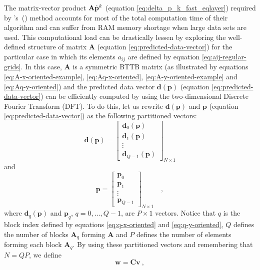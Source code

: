 \documentclass[manuscript,revised]{geophysics}
\begin{document}
The matrix-vector product $\tensor{A} \hat{\mathbf{p}}^{k}$ (equation \ref{eq:delta_p_k_fast_eqlayer}) 
required by \citeauthor{siqueira-etal2017}'s~(\citeyear{siqueira-etal2017}) method
accounts for most of the total computation time of their algorithm and can suffer
from RAM memory shortage when large data sets are used.
This computational load can be drastically lessen by exploring the well-defined structure of 
matrix $\mathbf{A}$ (equation \ref{eq:predicted-data-vector}) for the particular case in which 
its elements $a_{ij}$ are defined by equation \ref{eq:aij-regular-grids}. 
In this case, $\mathbf{A}$ is a symmetric BTTB matrix (as illustrated by equations
\ref{eq:A-x-oriented-example}, \ref{eq:Aq-x-oriented}, \ref{eq:A-y-oriented-example} and
\ref{eq:Aq-y-oriented}) and the predicted data vector 
$\mathbf{d}(\mathbf{p})$ (equation \ref{eq:predicted-data-vector}) can be efficiently
computed by using the two-dimensional Discrete Fourier Transform (DFT).
To do this, let us rewrite $\mathbf{d}(\mathbf{p})$ and
$\mathbf{p}$ (equation \ref{eq:predicted-data-vector}) as the following partitioned vectors:
\begin{equation}
\mathbf{d}(\mathbf{p}) = \begin{bmatrix}
\mathbf{d}_{0}(\mathbf{p}) \\
\mathbf{d}_{1}(\mathbf{p}) \\
\vdots \\
\mathbf{d}_{Q - 1}(\mathbf{p})
\end{bmatrix}_{N \times 1}
\label{eq:predicted-data-vector-partitioned}
\end{equation}
and
\begin{equation}
\mathbf{p} = \begin{bmatrix}
\mathbf{p}_{0} \\
\mathbf{p}_{1} \\
\vdots \\
\mathbf{p}_{Q - 1}
\end{bmatrix}_{N \times 1} \quad ,
\label{eq:parameter-vector-partitioned}
\end{equation}
where $\mathbf{d}_{q}(\mathbf{p})$ and $\mathbf{p}_{q}$, $q = 0, \dots, Q - 1$,
are $P \times 1$ vectors. Notice that $q$ is the block index defined by equations 
\ref{eq:q-x-oriented} and \ref{eq:q-y-oriented}, $Q$ defines the number of blocks
$\mathbf{A}_{q}$ forming $\mathbf{A}$ and $P$ defines the number of elements forming 
each block $\mathbf{A}_{q}$.
By using these partitioned vectors and remembering that $N = QP$, we define 
\begin{equation}
\mathbf{w} = \mathbf{C} \mathbf{v} \: ,
\label{eq:embedding-BCCB-matrix-vector-product}
\end{equation}
\end{document}
